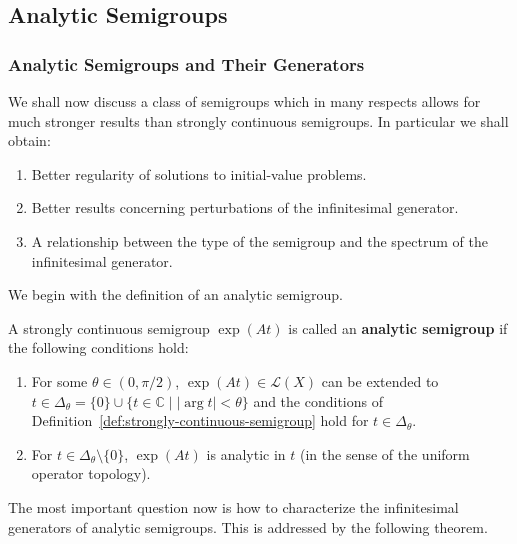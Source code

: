 \subsection{Analytic Semigroups}\label{sec:analytic-semigroups}

\subsubsection{Analytic Semigroups and Their Generators}\label{subsec:analytic-semigroups-generators}

We shall now discuss a class of semigroups which in many respects allows for much stronger results than strongly continuous semigroups. In particular we shall obtain:\begin{enumerate}\item Better regularity of solutions to initial-value problems.\item Better results concerning perturbations of the infinitesimal generator.\item A relationship between the type of the semigroup and the spectrum of the infinitesimal generator.\end{enumerate}We begin with the definition of an analytic semigroup.

\begin{Definition}
\label{def:analytic-semigroup}
A strongly continuous semigroup $\exp(At)$ is called an \textbf{analytic semigroup} if the following conditions hold:\begin{enumerate}\item For some $\theta\in(0,\pi/2)$, $\exp(At)\in\mathcal{L}(X)$ can be extended to $t\in\Delta_\theta=\{0\}\cup\{t\in\mathbb{C}\mid|\arg t|<\theta\}$ and the conditions of Definition~\ref{def:strongly-continuous-semigroup} hold for $t\in\Delta_\theta$.\item For $t\in\Delta_\theta\setminus\{0\}$, $\exp(At)$ is analytic in $t$ (in the sense of the uniform operator topology).\end{enumerate}
\end{Definition}

The most important question now is how to characterize the infinitesimal generators of analytic semigroups. This is addressed by the following theorem.

